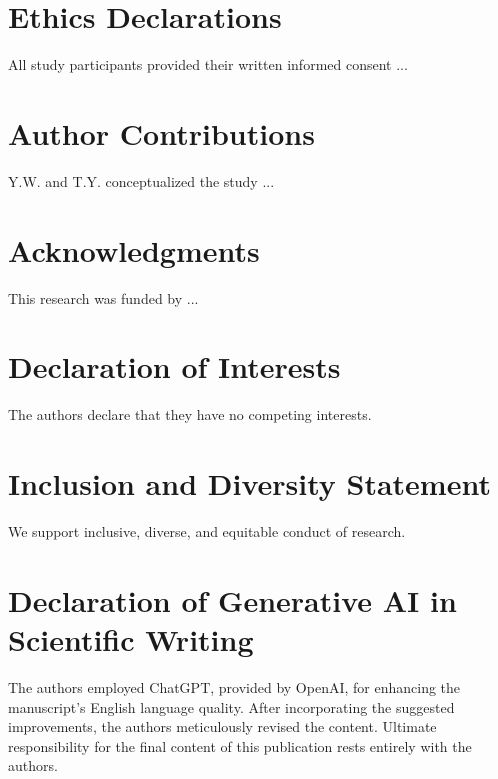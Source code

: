 

\section*{Ethics Declarations}
All study participants provided their written informed consent ...
\label{ethics declarations}

\section*{Author Contributions}
Y.W. and T.Y. conceptualized the study ...
\label{author contributions}

\section*{Acknowledgments}
This research was funded by ...
\label{acknowledgments}

\section*{Declaration of Interests}
The authors declare that they have no competing interests.
\label{declaration of interests}

\section*{Inclusion and Diversity Statement}
We support inclusive, diverse, and equitable conduct of research.
\label{inclusion and diversity statement}

\section*{Declaration of Generative AI in Scientific Writing}
The authors employed ChatGPT, provided by OpenAI, for enhancing the manuscript's English language quality. After incorporating the suggested improvements, the authors meticulously revised the content. Ultimate responsibility for the final content of this publication rests entirely with the authors.
\label{declaration of generative ai in scientific writing}

